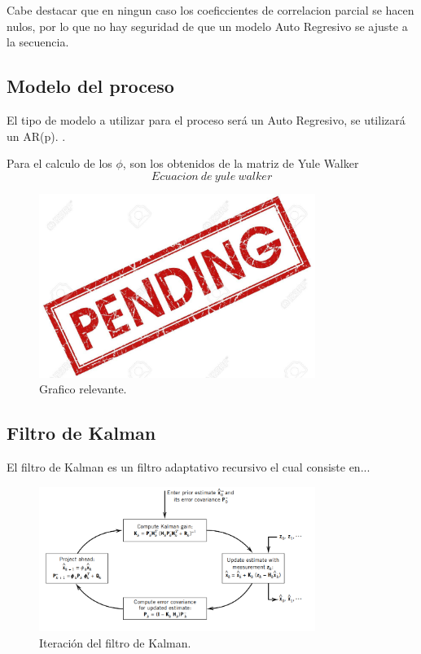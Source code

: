 Cabe destacar que en ningun caso los coeficcientes de correlacion parcial se hacen nulos, por lo que no hay seguridad de que un modelo Auto Regresivo se ajuste a la secuencia.
\subsection{Modelo del proceso}
\label{subsec:modelo}

El tipo de modelo a utilizar para el proceso será un Auto Regresivo, se utilizará un AR(p). .

Para el calculo de los $\phi$, son los obtenidos de la matriz de Yule Walker
\begin{equation}
Ecuacion \ de \ yule \  walker
\end{equation}


\begin{figure}[H]
\centering

	\includegraphics[width=0.8\textwidth, trim = {0 0 0 0.},clip]{./Imagenes/pend.jpg}
	\caption{Grafico relevante.}

	\label{fig:Rxxcalc}
\end{figure}


\subsection{Filtro de Kalman}
El filtro de Kalman es un filtro adaptativo recursivo el cual consiste en...
\begin{figure}[H]
\centering

	\includegraphics[width=0.8\textwidth, trim = {0 0 0 0},clip]{./Imagenes/kalman_loop.png}
	\caption{Iteración del filtro de Kalman.}
	\label{fig:Kalman_loop}

\end{figure}

